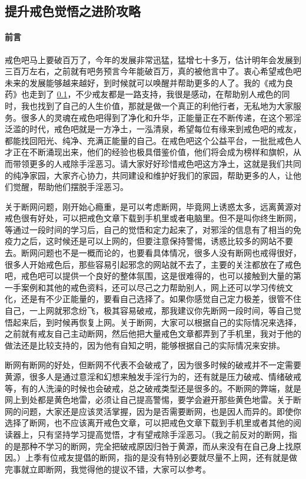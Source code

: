 \subsection{提升戒色觉悟之进阶攻略}\label{80}

\paragraph*{前言}

戒色吧马上要破百万了，今年的发展非常迅猛，猛增七十多万，估计明年会发展到三百万左右，之前就有吧务预言今年能破百万，真的被他言中了。衷心希望戒色吧未来的发展能够越来越好，到时候就可以唤醒并帮助更多的人了。我的《戒为良药》也走到了 \ref{80}，不少戒友都是一路支持，我很是感动，在帮助别人戒色的同时，我也找到了自己的人生价值，那就是做一个真正的利他行者，无私地为大家服务。很多人的灵魂在戒色吧得到了净化和升华，正能量正在不断传递，在这个邪淫泛滥的时代，戒色吧就是一方净土，一泓清泉，希望每位有缘来到戒色吧的戒友，都能找回阳光、纯净、充满正能量的自己。在戒色吧这个公益平台，一批批戒色人才正在不断涌现出来，他们的经验也极具借鉴价值，他们将会成为榜样和旗帜，从而带领更多的人戒除手淫恶习。请大家好好珍惜戒色吧这方净土，这就是我们共同的纯净家园，大家齐心协力，共同建设和维护好我们的家园，帮助更多的人，让他们觉醒，帮助他们摆脱手淫恶习。

关于断网问题，刚开始心瘾重，是可以考虑断网，毕竟网上诱惑太多，远离黄源对戒色很有好处，可以把戒色文章下载到手机里或者电脑里。但不是叫你终生断网，等通过一段时间的学习后，自己的觉悟和定力起来了，对邪淫的信息有了相当的免疫力之后，这时候还是可以上网的，但要注意保持警惕，诱惑比较多的网站不要去。断网问题也不是一概而论的，也要看具体情况，很多人没有断网也戒得很好，很多人开始戒色后，那些容易引起邪念的网站就不去了，主要的关注都放在了戒色吧，戒色吧可以提供一个良好的整体氛围，这是很难得的，也可以接触到大量的第一手案例和其他的戒色资料，还可以尽己之力帮助别人，网上还可以学习传统文化，还是有不少正能量的，要看自己选择了。如果你感觉自己定力极差，很管不住自己，一上网就邪念纷飞，极其容易破戒，那我建议你先断网一段时间，等自己觉悟起来后，到时候再恢复上网。关于断网，大家可以根据自己的实际情况来选择，之前就有戒友自己主动断网，然后他把大量戒色文章都弄到了手机里，我对于他的做法还是比较支持的，因为他有自知之明，能够根据自己的实际情况来安排。

断网有断网的好处，但断网不代表不会破戒了，因为很多时候的破戒并不一定需要黄源，很多人是通过意淫和幻想来触发手淫行为的，还有就是压力破戒、情绪破戒等，有的人洗澡的时候也会破戒，总之破戒类型还是很多的。不断网的弊端，就是网上到处都是黄色地雷，必须让自己提高警惕，要学会避开那些黄色地雷。关于断网的问题，大家还是应该灵活掌握，因为是否需要断网，也是因人而异的。即使你选择了断网，也不应该离开戒色文章，可以把戒色文章下载到手机里或者其他的阅读器上，只有坚持学习提高觉悟，才有望戒除手淫恶习。（我之前反对的断网，指的是那种不学习的断网，完全把破戒原因归咎于黄源，而从来没有在自己身上找原因。）上季有位戒友提倡的断网，指的是没有特别必要就尽量不上网，还有就是做完事就立即断网，我觉得他的提议不错，大家可以参考。

